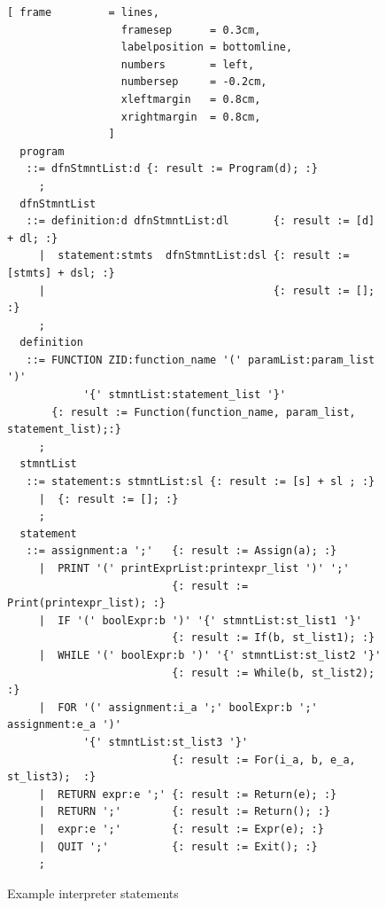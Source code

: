 \begin{figure}[!ht]

\begin{Verbatim}[ frame         = lines, 
                  framesep      = 0.3cm, 
                  labelposition = bottomline,
                  numbers       = left,
                  numbersep     = -0.2cm,
                  xleftmargin   = 0.8cm,
                  xrightmargin  = 0.8cm,
                ]
  program 
   ::= dfnStmntList:d {: result := Program(d); :}
     ;
  dfnStmntList 
   ::= definition:d dfnStmntList:dl       {: result := [d] + dl; :}
     |  statement:stmts  dfnStmntList:dsl {: result := [stmts] + dsl; :}
     |                                    {: result := []; :}
     ;
  definition 
   ::= FUNCTION ZID:function_name '(' paramList:param_list ')' 
			'{' stmntList:statement_list '}'
       {: result := Function(function_name, param_list, statement_list);:}
     ;
  stmntList
   ::= statement:s stmntList:sl {: result := [s] + sl ; :}
     |  {: result := []; :}
     ;
  statement 
   ::= assignment:a ';'   {: result := Assign(a); :}    
     |  PRINT '(' printExprList:printexpr_list ')' ';'      
                          {: result := Print(printexpr_list); :}
     |  IF '(' boolExpr:b ')' '{' stmntList:st_list1 '}'    
                          {: result := If(b, st_list1); :}
     |  WHILE '(' boolExpr:b ')' '{' stmntList:st_list2 '}' 
                          {: result := While(b, st_list2); :}
     |  FOR '(' assignment:i_a ';' boolExpr:b ';' assignment:e_a ')' 
		    '{' stmntList:st_list3 '}' 
                          {: result := For(i_a, b, e_a, st_list3);  :}
     |  RETURN expr:e ';' {: result := Return(e); :}
     |  RETURN ';'        {: result := Return(); :}
     |  expr:e ';'        {: result := Expr(e); :}      
     |  QUIT ';'          {: result := Exit(); :}
     ;
\end{Verbatim}
\caption{Example interpreter statements}
\label{fig:example_interpreter_grammar_statements}
\end{figure}
